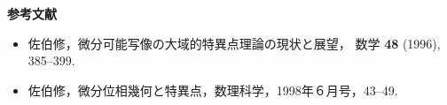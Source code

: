 \documentclass[uplatex,dvipdfmx]{jlreq}
\begin{document}
\medskip

\begin{center}
  \textbf{参考文献}
\end{center}

\begin{itemize}
  \setlength{\itemsep}{3pt}
  \item 佐伯修，微分可能写像の大域的特異点理論の現状と展望，
        数学 \textbf{48} (1996), 385--399.
  \item 佐伯修，微分位相幾何と特異点，数理科学，1998年６月号，43--49.
\end{itemize}
\end{document}
